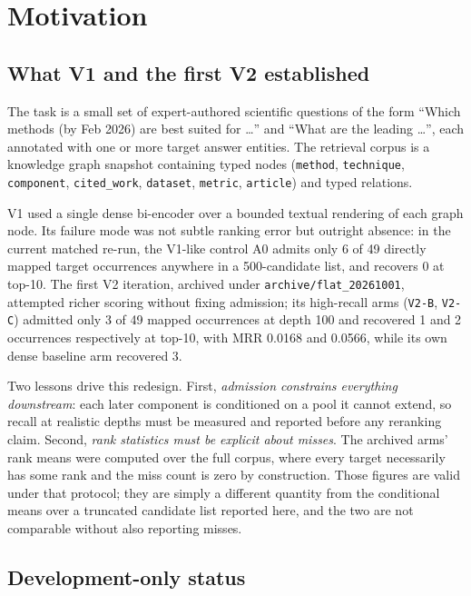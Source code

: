 \documentclass[11pt,a4paper]{article}
\begin{document}
\tableofcontents

\section{Motivation}

\subsection{What V1 and the first V2 established}

The task is a small set of expert-authored scientific questions of the form ``Which methods (by Feb 2026)
are best suited for \ldots{}'' and ``What are the leading \ldots{}'', each annotated with one or more target
answer entities. The retrieval corpus is a knowledge graph snapshot containing typed nodes
(\texttt{method}, \texttt{technique}, \texttt{component}, \texttt{cited\_work}, \texttt{dataset},
\texttt{metric}, \texttt{article}) and typed relations.

V1 used a single dense bi-encoder over a bounded textual rendering of each graph node. Its failure mode was
not subtle ranking error but outright absence: in the current matched re-run, the V1-like control A0 admits
only 6 of 49 directly mapped target occurrences anywhere in a 500-candidate list, and recovers 0 at top-10.
The first V2 iteration, archived under \texttt{archive/flat\_20261001}, attempted richer scoring without
fixing admission; its high-recall arms (\texttt{V2-B}, \texttt{V2-C}) admitted only 3 of 49 mapped
occurrences at depth 100 and recovered 1 and 2 occurrences respectively at top-10, with MRR 0.0168 and
0.0566, while its own dense baseline arm recovered 3.

Two lessons drive this redesign. First, \emph{admission constrains everything downstream}: each later
component is conditioned on a pool it cannot extend, so recall at realistic depths must be measured and
reported before any reranking claim. Second, \emph{rank statistics must be explicit about misses}. The
archived arms' rank means were computed over the full corpus, where every target necessarily has some rank
and the miss count is zero by construction. Those figures are valid under that protocol; they are simply a
different quantity from the conditional means over a truncated candidate list reported here, and the two are
not comparable without also reporting misses.

\subsection{Development-only status}
\end{document}
